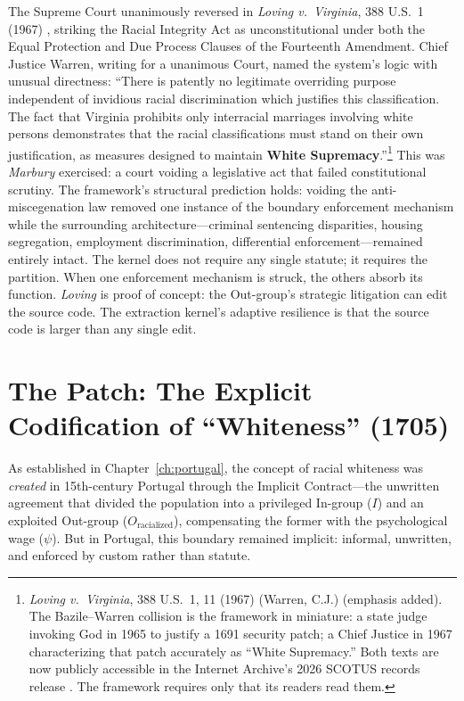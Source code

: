The Supreme Court unanimously reversed in \textit{Loving v.\ Virginia}, 388 U.S.\ 1 (1967) \cite{loving_v_virginia_record_1967}, striking the Racial Integrity Act as unconstitutional under both the Equal Protection and Due Process Clauses of the Fourteenth Amendment. Chief Justice Warren, writing for a unanimous Court, named the system's logic with unusual directness: ``There is patently no legitimate overriding purpose independent of invidious racial discrimination which justifies this classification. The fact that Virginia prohibits only interracial marriages involving white persons demonstrates that the racial classifications must stand on their own justification, as measures designed to maintain \textbf{White Supremacy}.''\footnote{\textit{Loving v.\ Virginia}, 388 U.S.\ 1, 11 (1967) (Warren, C.J.) (emphasis added). The Bazile--Warren collision is the framework in miniature: a state judge invoking God in 1965 to justify a 1691 security patch; a Chief Justice in 1967 characterizing that patch accurately as ``White Supremacy.'' Both texts are now publicly accessible in the Internet Archive's 2026 SCOTUS records release \cite{ia_scotus_briefs_2026}. The framework requires only that its readers read them.} This was \textit{Marbury} exercised: a court voiding a legislative act that failed constitutional scrutiny. The framework's structural prediction holds: voiding the anti-miscegenation law removed one instance of the boundary enforcement mechanism while the surrounding architecture---criminal sentencing disparities, housing segregation, employment discrimination, differential enforcement---remained entirely intact. The kernel does not require any single statute; it requires the partition. When one enforcement mechanism is struck, the others absorb its function. \textit{Loving} is proof of concept: the Out-group's strategic litigation can edit the source code. The extraction kernel's adaptive resilience is that the source code is larger than any single edit.

\section{The Patch: The Explicit Codification of ``Whiteness'' (1705)}
As established in Chapter~\ref{ch:portugal}, the concept of racial whiteness was \textit{created} in 15th-century Portugal through the Implicit Contract---the unwritten agreement that divided the population into a privileged In-group ($I$) and an exploited Out-group ($O_{\text{racialized}}$), compensating the former with the psychological wage ($\psi$). But in Portugal, this boundary remained implicit: informal, unwritten, and enforced by custom rather than statute.

